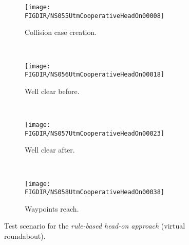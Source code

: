 \begin{figure}[H]
    \centering
    \begin{subfigure}{0.75\textwidth}
        \centering
        \texttt{[image: \\FIGDIR/NS055UtmCooperativeHeadOn00008]}
        \caption{Collision case creation.}
        \label{fig:ruleBasedHeadOnSituationCollisionCaseCreation}
    \end{subfigure}
    \\
    \begin{subfigure}{0.75\textwidth}
        \centering
        \texttt{[image: \\FIGDIR/NS056UtmCooperativeHeadOn00018]} 
        \caption{Well clear before.}
        \label{fig:ruleBasedHeadOnWellClearBefore}
    \end{subfigure}
    \\
    \begin{subfigure}{0.75\textwidth}
        \centering
        \texttt{[image: \\FIGDIR/NS057UtmCooperativeHeadOn00023]} 
        \caption{Well clear after.}
        \label{fig:ruleBasedHeadOnWellClearAfter}
    \end{subfigure}
    \\
    \begin{subfigure}{0.75\textwidth}
        \centering
        \texttt{[image: \\FIGDIR/NS058UtmCooperativeHeadOn00038]} 
        \caption{Waypoints reach.}
        \label{fig:ruleBasedHeadOnWaypointsReach}
    \end{subfigure}
    \caption{Test scenario for the \emph{rule-based head-on approach} (virtual roundabout). }
    \label{fig:testCaseRuleBasedHeadOnApproach}
\end{figure}

